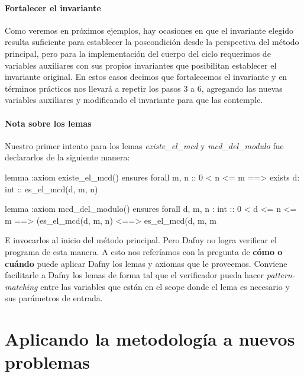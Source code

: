 \documentclass[12pt, a4paper, openany, fleqn]{book}
\begin{document}
    \begin{greenbox}
    \end{greenbox}

    \subsubsection{Fortalecer el invariante}
    Como veremos en próximos ejemplos, hay ocasiones en que el invariante elegido resulta suficiente para establecer la poscondición desde la perspectiva del método principal, pero para la implementación del cuerpo del ciclo requerimos de variables auxiliares con sus propios invariantes que posibilitan establecer el invariante original.
    En estos casos decimos que fortalecemos el invariante y en términos prácticos nos llevará a repetir los pasos 3 a 6, agregando las nuevas variables auxiliares y modificando el invariante para que las contemple.

    \subsubsection{Nota sobre los lemas}
    Nuestro primer intento para los lemas \textit{existe\_el\_mcd} y \textit{mcd\_del\_modulo} fue declararlos de la siguiente manera:

    \begin{greenbox}
    \begin{dafny}[gobble=8]
        lemma {:axiom} existe_el_mcd()
            ensures forall m, n :: 0 < n <= m ==>
                exists d: int :: es_el_mcd(d, m, n)

        lemma {:axiom} mcd_del_modulo()
            ensures forall d, m, n : int :: 0 < d <= n <= m ==>
                (es_el_mcd(d, m, n) <==> es_el_mcd(d, m, m %
    \end{dafny}
    \end{greenbox}

    E invocarlos al inicio del método principal. Pero Dafny no logra verificar el programa de esta manera. A esto nos referíamos con la pregunta de \textbf{cómo o cuándo} puede aplicar Dafny los lemas y axiomas que le proveemos. Conviene facilitarle a Dafny los lemas de forma tal que el verificador pueda hacer \textit{pattern-matching} entre las variables que están en el scope donde el lema es necesario y sus parámetros de entrada.

    \chapter{Aplicando la metodología a nuevos problemas}
\end{document}
